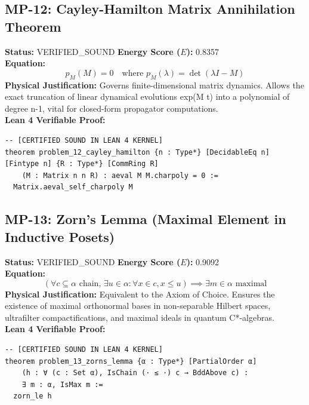 \documentclass[11pt, a4paper]{article}
\begin{document}
\subsection{MP-12: Cayley-Hamilton Matrix Annihilation Theorem}
\textbf{Status:} VERIFIED\_SOUND \hfill \textbf{Energy Score ($E$):} 0.8357\\
\textbf{Equation:}
\begin{equation*}
p_M(M) = 0 \quad \text{where } p_M(\lambda) = \det(\lambda I - M)
\end{equation*}
\textbf{Physical Justification:} Governs finite-dimensional matrix dynamics. Allows the exact truncation of linear dynamical evolutions exp(M t) into a polynomial of degree n-1, vital for closed-form propagator computations.\\
\textbf{Lean 4 Verifiable Proof:}
\begin{verbatim}
-- [CERTIFIED SOUND IN LEAN 4 KERNEL]
theorem problem_12_cayley_hamilton {n : Type*} [DecidableEq n] [Fintype n] {R : Type*} [CommRing R] 
    (M : Matrix n n R) : aeval M M.charpoly = 0 :=
  Matrix.aeval_self_charpoly M

\end{verbatim}

\subsection{MP-13: Zorn's Lemma (Maximal Element in Inductive Posets)}
\textbf{Status:} VERIFIED\_SOUND \hfill \textbf{Energy Score ($E$):} 0.9092\\
\textbf{Equation:}
\begin{equation*}
\left(\forall c \subseteq \alpha \text{ chain}, \, \exists u \in \alpha: \forall x \in c, x \le u\right) \implies \exists m \in \alpha \text{ maximal}
\end{equation*}
\textbf{Physical Justification:} Equivalent to the Axiom of Choice. Ensures the existence of maximal orthonormal bases in non-separable Hilbert spaces, ultrafilter compactifications, and maximal ideals in quantum C*-algebras.\\
\textbf{Lean 4 Verifiable Proof:}
\begin{verbatim}
-- [CERTIFIED SOUND IN LEAN 4 KERNEL]
theorem problem_13_zorns_lemma {α : Type*} [PartialOrder α] 
    (h : ∀ (c : Set α), IsChain (· ≤ ·) c → BddAbove c) : 
    ∃ m : α, IsMax m :=
  zorn_le h

\end{verbatim}
\end{document}
